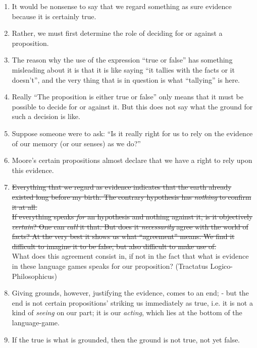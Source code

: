 \documentclass{book}
\begin{document}
\begin{enumerate}
\item
It would be nonsense to say that we regard something as sure evidence because
it is certainly true.

\item
Rather, we must first determine the role of deciding for or against a
proposition.

\item
The reason why the use of the expression ``true or false'' has something
misleading about it is that it is like saying ``it tallies with the facts or it
doesn't'', and the very thing that is in question is what ``tallying'' is here.

\item
Really ``The proposition is either true or false'' only means that it must be
possible to decide for or against it. But this does not say what the ground for
such a decision is like.

\item
Suppose someone were to ask: ``Is it really right for us to rely on the
evidence of our memory (or our senses) as we do?''

\item
Moore's certain propositions almost declare that we have a right to rely upon
this evidence.

\item
\st{Everything that we regard as evidence indicates that the earth already
	existed long before my birth. The contrary hypothesis has \emph{nothing} to
	confirm it at all. \\ If everything speaks \emph{for} an hypothesis and
	nothing against it, is it objectively \emph{certain}? One can \emph{call}
	it that. But does it \emph{necessarily} agree with the world of facts? At
	the very best it shows us what ``agreement'' means. We find it difficult to
	imagine it to be false, but also difficult to make use of.} \\
What does this agreement consist in, if not in the fact that what is evidence
in these language games speaks for our proposition?  (Tractatus
Logico-Philosophicus)

\item
Giving grounds, however, justifying the evidence, comes to an end; - but the
end is not certain propositions' striking us immediately as true, i.e. it is
not a kind of \emph{seeing} on our part; it is our \emph{acting}, which lies at
the bottom of the language-game.

\item
If the true is what is grounded, then the ground is not true, not yet false.


\end{enumerate}
\end{document}
